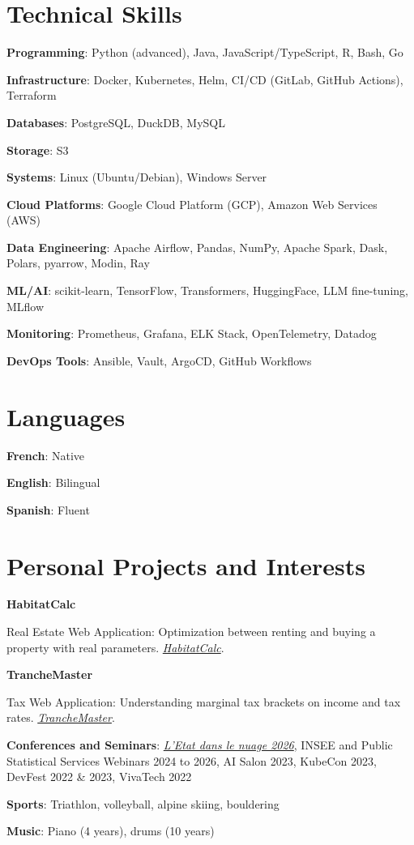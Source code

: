 \documentclass[a4paper,10pt]{article}
\newlength{\spaceItemEnd}\setlength{\spaceItemEnd}{-0.8pt}
\newlength{\spaceSubItem}\setlength{\spaceSubItem}{-4pt}
\newlength{\spaceJobMission}\setlength{\spaceJobMission}{3pt}
\newlength{\spaceProjSec}\setlength{\spaceProjSec}{0.5mm}
\newcommand{\resumeItem}[2]{
  \item\small{
    \textbf{#1}{: #2\vspace{\spaceItemEnd}}
  }
}
\newcommand{\resumeSubItem}[2]{
    \small{\resumeItem{#1}{#2}\vspace{\spaceSubItem}}
	
}
\newcommand{\resumeSubHeadingListStart}{\begin{itemize}[leftmargin=*]}
\newcommand{\resumeSubHeadingListEnd}{\end{itemize}}
\newcommand{\resumeJobMission}[2]{
    \item\small{
        \textbf{#1} \\ 
        \begin{minipage}{0.95\textwidth}
            \small{#2}
        \end{minipage}
    }
    \vspace{\spaceJobMission}
}
\begin{document}
\begin{minipage}[t]{0.65\linewidth}
    \section{Technical Skills}
    \resumeSubHeadingListStart
    \resumeSubItem{Programming}{Python (advanced), Java, JavaScript/TypeScript, R, Bash, Go}
    \resumeSubItem{Infrastructure}{Docker, Kubernetes, Helm, CI/CD (GitLab, GitHub Actions), Terraform}
    \resumeSubItem{Databases}{PostgreSQL, DuckDB, MySQL}
    \resumeSubItem{Storage}{S3}
    \resumeSubItem{Systems}{Linux (Ubuntu/Debian), Windows Server}
    \resumeSubItem{Cloud Platforms}{Google Cloud Platform (GCP), Amazon Web Services (AWS)}
    \resumeSubItem{Data Engineering}{Apache Airflow, Pandas, NumPy, Apache Spark, Dask, Polars, pyarrow, Modin, Ray}
    \resumeSubItem{ML/AI}{scikit-learn, TensorFlow, Transformers, HuggingFace, LLM fine-tuning, MLflow}
    \resumeSubItem{Monitoring}{Prometheus, Grafana, ELK Stack, OpenTelemetry, Datadog}
    \resumeSubItem{DevOps Tools}{Ansible, Vault, ArgoCD, GitHub Workflows}
    \resumeSubHeadingListEnd
    \end{minipage}
\hfill
\begin{minipage}[t]{0.3\linewidth}
    \section{Languages}
    \resumeSubHeadingListStart
    \resumeSubItem{French}{Native}
    \resumeSubItem{English}{Bilingual}
    \resumeSubItem{Spanish}{Fluent}
    \resumeSubHeadingListEnd
\end{minipage}



\section{Personal Projects and Interests}
\vspace{\spaceProjSec}
\begin{minipage}[t]{0.9865\textwidth}
\resumeSubHeadingListStart

\resumeJobMission    {HabitatCalc}    {Real Estate Web Application: Optimization between renting and buying a property with real parameters. \href{https://odysseu.github.io/HabitatCalc/}{\textit{HabitatCalc}}.}
\resumeJobMission    {TrancheMaster}    {Tax Web Application: Understanding marginal tax brackets on income and tax rates. \href{https://odysseu.github.io/TrancheMaster/}{\textit{TrancheMaster}}.}
  \resumeSubItem{Conferences and Seminars}{\href{https://www.numerique.gouv.fr/agenda/etat-dans-le-nuage-2026/}{\textit{L'Etat dans le nuage 2026}}, INSEE and Public Statistical Services Webinars 2024 to 2026, AI Salon 2023, KubeCon 2023, DevFest 2022 \& 2023, VivaTech 2022}
  \resumeSubItem{Sports}{Triathlon, volleyball, alpine skiing, bouldering}
  \resumeSubItem{Music}{Piano (4 years), drums (10 years)}
\resumeSubHeadingListEnd
\end{minipage}


\end{document}
